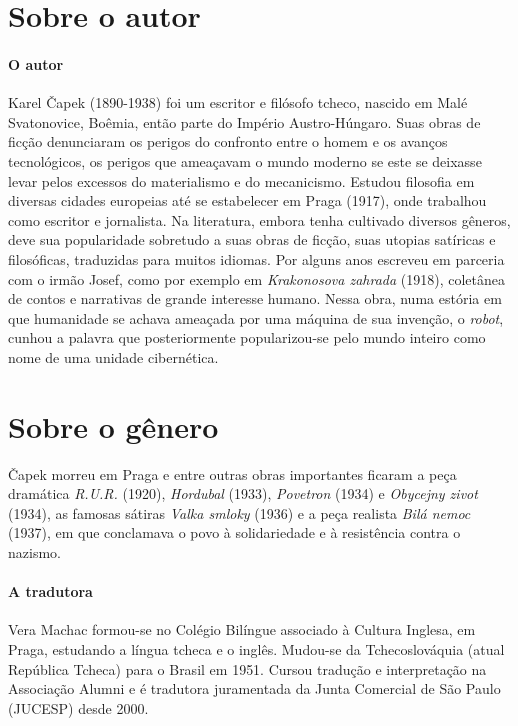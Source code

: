 \documentclass[11pt]{extarticle}
\begin{document}

\section{Sobre o autor}

\paragraph{O autor} Karel Čapek (1890-1938) foi um escritor e filósofo tcheco, nascido em Malé Svatonovice, Boêmia, então parte do Império Austro-Húngaro. Suas obras de ficção denunciaram os perigos do confronto entre o homem e os avanços tecnológicos, os perigos que ameaçavam o mundo moderno se este se deixasse levar pelos excessos do materialismo e do mecanicismo. Estudou filosofia em diversas cidades europeias até se estabelecer em Praga (1917), onde trabalhou como escritor e jornalista. Na literatura, embora tenha cultivado diversos gêneros, deve sua popularidade sobretudo a suas obras de ficção, suas utopias satíricas e filosóficas, traduzidas para muitos idiomas. Por alguns anos escreveu em parceria com o irmão Josef, como por exemplo em \textit{Krakonosova zahrada} (1918), coletânea de contos e narrativas de grande interesse humano. Nessa obra, numa estória em que humanidade se achava ameaçada por uma máquina de sua invenção, o \textit{robot}, cunhou a palavra que posteriormente popularizou-se pelo mundo inteiro como nome de uma unidade cibernética. 

\section{Sobre o gênero}

Čapek morreu em Praga e entre outras obras importantes ficaram a peça dramática \textit{R.U.R.} (1920), \textit{Hordubal} (1933), \textit{Povetron} (1934) e \textit{Obycejny zivot} (1934), as famosas sátiras \textit{Valka smloky} (1936) e a peça realista \textit{Bilá nemoc} (1937), em que conclamava o povo à solidariedade e à resistência contra o nazismo.

\paragraph{A tradutora} Vera Machac formou-se no Colégio Bilíngue associado à Cultura Inglesa, em Praga, estudando a língua tcheca e o inglês. Mudou-se da Tchecoslováquia (atual República Tcheca) para o Brasil em 1951. Cursou tradução e interpretação na Associação Alumni e é tradutora juramentada da Junta Comercial de São Paulo (JUCESP) desde 2000.  
\end{document}
